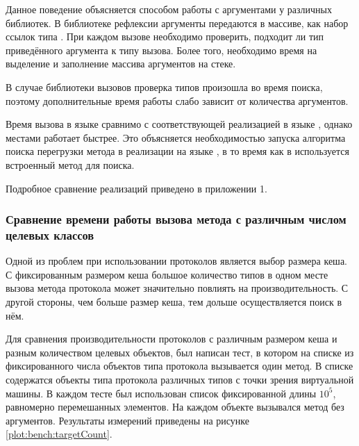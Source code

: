 Данное поведение объясняется способом работы с аргументами у различных библиотек. В библиотеке рефлексии аргументы передаются в массиве, как набор ссылок типа . При каждом вызове необходимо проверить, подходит ли тип приведённого аргумента к типу вызова. Более того, необходимо время на выделение и заполнение массива аргументов на стеке.

В случае библиотеки вызовов проверка типов произошла во время поиска, поэтому дополнительные время работы слабо зависит от количества аргументов.

Время вызова в языке  сравнимо с соответствующей реализацией в языке , однако местами работает быстрее. Это объясняется необходимостью запуска алгоритма поиска перегрузки метода в реализации на языке , в то время как в  используется встроенный метод для поиска.

Подробное сравнение реализаций приведено в приложении 1.

\subsubsection{Сравнение времени работы вызова метода с различным числом целевых классов}
Одной из проблем при использовании протоколов является выбор размера кеша. С фиксированным размером кеша большое количество типов в одном месте вызова метода протокола может значительно повлиять на  производительность. С другой стороны, чем больше размер кеша, тем дольше осуществляется поиск в нём.

Для сравнения производительности протоколов с различным размером кеша и разным количеством целевых объектов, был написан тест, в котором на списке из фиксированного числа объектов типа протокола вызывается один метод. В списке содержатся объекты типа протокола различных типов с точки зрения виртуальной машины. В каждом тесте был использован список фиксированной длины $10^5$, равномерно перемешанных элементов. На каждом объекте вызывался метод без аргументов. Результаты измерений приведены на рисунке \ref{plot:bench:targetCount}.

